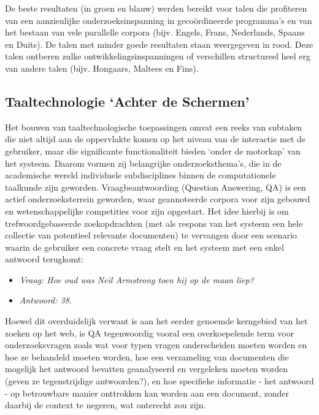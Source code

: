 \documentclass[]{../../metanetpaper}
\begin{document}
\begin{multicols}{2}
    De beste resultaten (in groen en blauw) werden bereikt voor talen die profiteren van een aanzienlijke onderzoeksinspanning in geco{\"o}rdineerde programma's en van het bestaan van vele parallelle corpora (bijv. Engels, Frans, Nederlands, Spaans en Duits). De talen met minder goede resultaten staan weergegeven in rood. Deze talen ontberen zulke ontwikkelingsinspanningen of verschillen structureel heel erg van andere talen (bijv. Hongaars, Maltees en Fins).

\subsection{Taaltechnologie `Achter de Schermen' }

    Het bouwen van taaltechnologische toepassingen omvat een reeks van subtaken die niet altijd aan de oppervlakte komen op het niveau van de interactie met de gebruiker, maar die significante functionaliteit bieden `onder de motorkap' van het systeem. Daarom vormen zij belangrijke onderzoeksthema's, die in de academische wereld individuele subdisciplines binnen de computationele taalkunde zijn geworden.
    Vraagbeantwoording (Question Answering, QA) is een actief onderzoeksterrein geworden, waar geannoteerde corpora voor zijn gebouwd en wetenschappelijke competities voor zijn opgestart. Het idee hierbij is om trefwoordgebaseerde zoekopdrachten (met als respons van het systeem een hele collectie van potentieel relevante documenten) te vervangen door een scenario waarin de gebruiker een concrete vraag stelt en het systeem met een enkel antwoord terugkomt:

\begin{itemize}
\item[] \textit{Vraag: Hoe oud was Neil Armstrong toen hij op de maan liep?}
\item[] \textit{Antwoord: 38.}
\end{itemize}

 Hoewel dit overduidelijk verwant is aan het eerder genoemde kerngebied van het zoeken op het web, is QA tegenwoordig vooral een overkoepelende term voor onderzoeksvragen zoals wat voor typen vragen onderscheiden moeten worden en hoe ze behandeld moeten worden, hoe een verzameling van documenten die mogelijk het antwoord bevatten geanalyseerd en vergeleken moeten worden (geven ze tegenstrijdige antwoorden?), en hoe specifieke informatie - het antwoord - op betrouwbare manier onttrokken kan worden aan een document, zonder daarbij de context te negeren, wat onterecht zou zijn.


\end{multicols}
\end{document}
